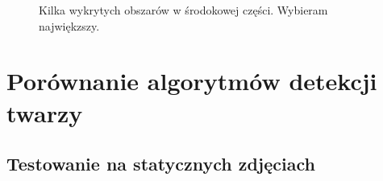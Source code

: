 \documentclass[10pt, a4paper]{article}
\begin{document}
\begin{itemize}
\begin{figure}[H]
\begin{center}
        \end{center}
        \caption{Kilka wykrytych obszarów w środokowej części. Wybieram najwiękzszy. \cite{readheadPortrait1}}
        \label{fig:face_size}
    \end{figure}
    
    
    
\end{itemize}


\section{Porównanie algorytmów detekcji twarzy}

\subsection{Testowanie na statycznych zdjęciach}
\end{document}
